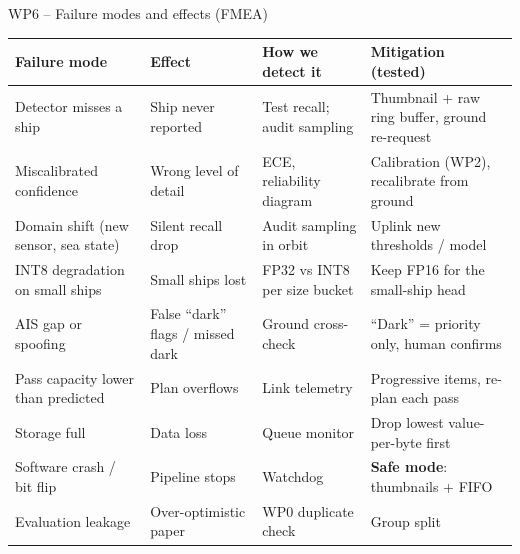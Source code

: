 \documentclass[aspectratio=169,10pt]{beamer}
\begin{document}
\begin{frame}{WP6 -- Failure modes and effects (FMEA)}
\scriptsize
\renewcommand{\arraystretch}{1.12}
\begin{tabularx}{\textwidth}{@{}P{2.9cm} P{2.9cm} P{2.5cm} L@{}}
\toprule
\textbf{Failure mode} & \textbf{Effect} & \textbf{How we detect it} & \textbf{Mitigation (tested)} \\
\midrule
Detector misses a ship & Ship never reported & Test recall; audit sampling & Thumbnail + raw ring buffer, ground re-request \\
Miscalibrated confidence & Wrong level of detail & ECE, reliability diagram & Calibration (WP2), recalibrate from ground \\
Domain shift (new sensor, sea state) & Silent recall drop & Audit sampling in orbit & Uplink new thresholds / model \\
INT8 degradation on small ships & Small ships lost & FP32 vs INT8 per size bucket & Keep FP16 for the small-ship head \\
AIS gap or spoofing & False ``dark'' flags / missed dark & Ground cross-check & ``Dark'' = priority only, human confirms \\
Pass capacity lower than predicted & Plan overflows & Link telemetry & Progressive items, re-plan each pass \\
Storage full & Data loss & Queue monitor & Drop lowest value-per-byte first \\
Software crash / bit flip & Pipeline stops & Watchdog & \textbf{Safe mode}: thumbnails + FIFO \\
Evaluation leakage & Over-optimistic paper & WP0 duplicate check & Group split \\
\bottomrule
\end{tabularx}
\end{frame}
\end{document}

